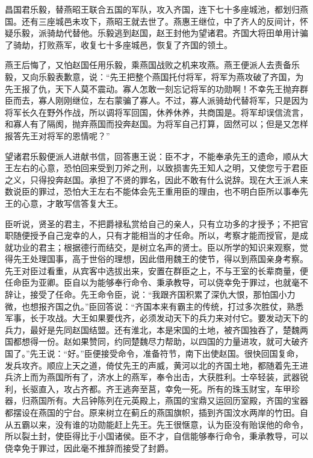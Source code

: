 \documentclass[12pt,UTF-8,openany]{ctexbook}
\begin{document}
\begin{normalsize}
    
    昌国君乐毅，替燕昭王联合五国的军队，攻入齐国，连下七十多座城池，都划归燕国。还有三座城邑未攻下，燕昭王就去世了。燕惠王继位，中了齐人的反间计，怀疑乐毅，派骑劫代替他。乐毅逃到赵国，赵王封他为望诸君。齐国大将田单用计骗了骑劫，打败燕军，收复七十多座城邑，恢复了齐国的领土。
    
    燕王后悔了，又怕赵国任用乐毅，乘燕国战败之机来攻燕。燕王便派人去责备乐毅，又向乐毅表歉意，说：“先王把整个燕国托付将军，将军为燕攻破了齐国，为先王报了仇，天下人莫不震动。寡人怎敢一刻忘记将军的功勋啊！不幸先王抛弃群臣而去，寡人刚刚继位，左右蒙骗了寡人。不过，寡人派骑劫代替将军，只是因为将军长久在野外作战，所以调将军回国，休养休养，共商国是。将军却误信流言，和寡人有了隔阂，抛弃燕国而投奔赵国。为将军自己打算，固然可以；但是又怎样报答先王对将军的恩情呢？”
    
    望诸君乐毅便派人进献书信，回答惠王说：臣不才，不能奉承先王的遗命，顺从大王左右的心意，恐怕回来受到刀斧之刑，以致损害先王知人之明，又使您亏于君臣之义，只得投奔赵国。承担了不贤的罪名，因此不敢有什么说辞。现在大王派人来数说臣的罪过，恐怕大王左右不能体会先王重用臣的理由，也不明白臣所以事奉先王的心意，才敢写信答复大王。
    
    臣听说，贤圣的君主，不把爵禄私赏给自己的亲人，只有立功多的才授予；不把官职随便授予自己宠幸的人，只有才能相当的才任命。所以，考察才能而授官，是成就功业的君主；根据德行而结交，是树立名声的贤士。臣以所学的知识来观察，觉得先王处理国事，高于世俗的理想，因此借用魏王的使节，得以到燕国亲身考察。先王对臣过看重，从宾客中选拔出来，安置在群臣之上，不与王室的长辈商量，便任命臣为亚卿。臣自以为能够奉行命令、秉承教导，可以侥幸免于罪过，也就毫不辞让，接受了任命。先王命令臣，说：“我跟齐国积累了深仇大恨，那怕国小力微，也想报齐国之仇。”臣回答说：“齐国本来有霸主的传统，打过多次胜仗，熟悉军事，长于攻战。大王如果要伐齐，必须发动天下的兵力来对付它。要发动天下的兵力，最好是先同赵国结盟。还有淮北，本是宋国的土地，被齐国独吞了，楚魏两国都想得一份。赵如果赞同，约同楚魏尽力帮助，以四国的力量进攻，就可大破齐国了。”先王说：“好。”臣便接受命令，准备符节，南下出使赵国。很快回国复命，发兵攻齐。顺应上天之道，倚仗先王的声威，黄河以北的齐国土地，都随着先王进兵济上而为燕国所有了，济水上的燕军，奉令出击，大获胜利。士卒轻装，武器锐利，长驱直入，攻占齐都。齐王逃奔至莒，幸免一死。所有的珠玉财宝，车甲珍器，归燕国所有。大吕钟陈列在元英殿上，燕国的宝鼎又运回历室殿，齐国的宝器都摆设在燕国的宁台。原来树立在蓟丘的燕国旗帜，插到齐国汶水两岸的竹田。自从五霸以来，没有谁的功勋能赶上先王。先王很惬意，认为臣没有贻误他的命令，所以裂土封，使臣得比于小国诸侯。臣不才，自信能够奉行命令，秉承教导，可以侥幸免于罪过，因此毫不推辞而接受了封爵。
    

\end{normalsize}
\end{document}
